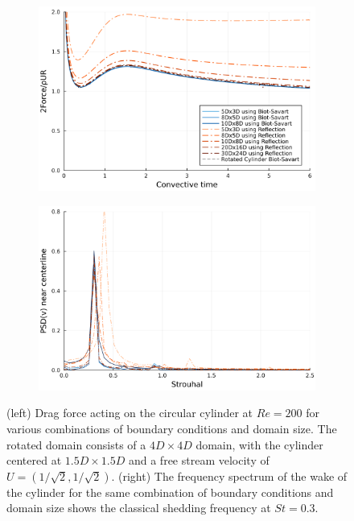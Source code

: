 \documentclass{article}
\begin{document}
\begin{figure}
    \centering
    \begin{subfigure}{.5\textwidth}
        \centering
        \includegraphics[width=\textwidth]{tex//fig/force.png}
    \end{subfigure}%
    \begin{subfigure}{.5\textwidth}
        \centering
        \includegraphics[width=\textwidth]{tex/fig/fft.png}
    \end{subfigure}%
    \caption{(left) Drag force acting on the circular cylinder at $Re=200$ for various combinations of boundary conditions and domain size. The rotated domain consists of a $4D\times4D$ domain, with the cylinder centered at $1.5D\times1.5D$ and a free stream velocity of $U=(1/\sqrt2,1/\sqrt2)$. (right) The frequency spectrum of the wake of the cylinder for the same combination of boundary conditions and domain size shows the classical shedding frequency at $St=0.3$.}
    \label{fig:cylinder_force}
\end{figure}
\end{document}
